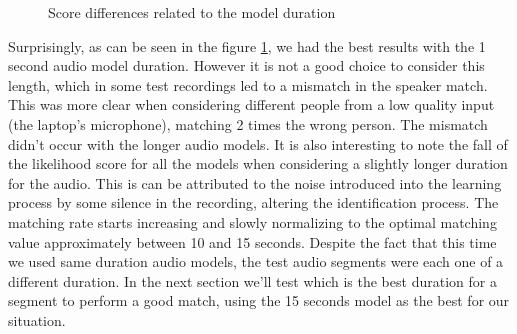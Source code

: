 \begin{figure}
\begin{center}


\caption{Score differences related to the model duration}
\label{chart:score-model-dur}
\end{center}
\end{figure}

Surprisingly, as can be seen in the figure \ref{chart:score-model-dur}, we had the best results with the
1 second audio model duration. However it is not a good choice to consider this length,
which in some test recordings led to a mismatch in the speaker match. This was more clear
when considering different people from a low quality input (the laptop's microphone),
matching 2 times the wrong person. The mismatch didn't occur with the longer audio models.
It is also interesting to note the fall of the likelihood score for all the models when considering
a slightly longer duration for the audio. This is can be attributed to the noise introduced into the learning process
by some silence in the recording, altering the identification process. The matching
rate starts increasing and slowly normalizing to the optimal matching value approximately
between 10 and 15 seconds.\newline
Despite the fact that this time we used same duration audio models, the test audio segments
were each one of a different duration. In the next section we'll test which is the best duration
for a segment to perform a good match, using the 15 seconds model as the best for our situation.

